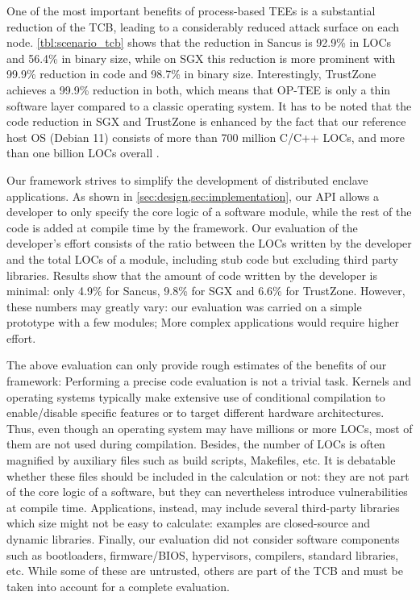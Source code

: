 One of the most important benefits of process-based \acp{TEE} is a substantial
reduction of the \ac{TCB}, leading to a considerably reduced attack surface on
each node. \cref{tbl:scenario_tcb} shows that the reduction in Sancus is 92.9\%
in \acp{LOC} and 56.4\% in binary size, while on \ac{SGX} this reduction is more
prominent with 99.9\% reduction in code and 98.7\% in binary size.
Interestingly, TrustZone achieves a 99.9\% reduction in both, which means that
OP-TEE is only a thin software layer compared to a classic operating system. It
has to be noted that the code reduction in \ac{SGX} and TrustZone is enhanced by
the fact that our reference host OS (Debian 11) consists of more than 700
million C/C++ \acp{LOC}, and more than one billion \acp{LOC} overall
\cite{debian-stats}.

Our framework strives to simplify the development of distributed enclave
applications. As shown in \cref{sec:design,sec:implementation}, our API allows a
developer to only specify the core logic of a software module, while the rest of
the code is added at compile time by the framework. Our evaluation of the
developer's effort consists of the ratio between the \acp{LOC} written by the
developer and the total \acp{LOC} of a module, including stub code but excluding
third party libraries. Results show that the amount of code written by the
developer is minimal: only 4.9\% for Sancus, 9.8\% for SGX and 6.6\% for
TrustZone. However, these numbers may greatly vary: our evaluation was carried
on a simple prototype with a few modules; More complex applications would
require higher effort.

The above evaluation can only provide  rough estimates of the benefits of our
framework: Performing a precise code evaluation is not a trivial task. Kernels
and operating systems typically make extensive use of conditional compilation to
enable/disable specific features or to target different hardware architectures.
Thus, even though an operating system may have millions or more \acp{LOC}, most
of them are not used during compilation. Besides, the number of \acp{LOC} is
often magnified by auxiliary files such as build scripts, Makefiles, etc. It is
debatable whether these files should be included in the calculation or not: they
are not part of the core logic of a software, but they can nevertheless
introduce vulnerabilities at compile time. Applications, instead, may include
several third-party libraries which size might not be easy to calculate:
examples are closed-source and dynamic libraries. Finally, our evaluation did
not consider software components such as bootloaders, firmware/BIOS,
hypervisors, compilers, standard libraries, etc. While some of these are
untrusted, others are part of the \ac{TCB} and must be taken into account for a
complete evaluation.
